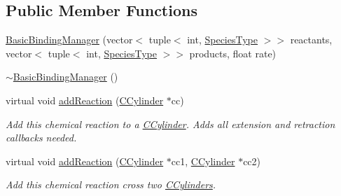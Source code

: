 \subsection*{Public Member Functions}
\begin{DoxyCompactItemize}
\item 
\hyperlink{classBasicBindingManager_ad57b38f098621ae0408069c49c17db52}{Basic\+Binding\+Manager} (vector$<$ tuple$<$ int, \hyperlink{Species_8h_a50651af47c56ea0e27235468d23542cf}{Species\+Type} $>$$>$ reactants, vector$<$ tuple$<$ int, \hyperlink{Species_8h_a50651af47c56ea0e27235468d23542cf}{Species\+Type} $>$$>$ products, float rate)
\item 
\hyperlink{classBasicBindingManager_ab382b0c661238e95df9d64f556ddc6d4}{$\sim$\+Basic\+Binding\+Manager} ()
\item 
virtual void \hyperlink{classBasicBindingManager_a9dbb688abc218187913b23fa3dccd97d}{add\+Reaction} (\hyperlink{classCCylinder}{C\+Cylinder} $\ast$cc)
\begin{DoxyCompactList}\small\item\em Add this chemical reaction to a \hyperlink{classCCylinder}{C\+Cylinder}. Adds all extension and retraction callbacks needed. \end{DoxyCompactList}\item 
virtual void \hyperlink{classBasicBindingManager_aea22a428f792f83f02ba58796ccd882e}{add\+Reaction} (\hyperlink{classCCylinder}{C\+Cylinder} $\ast$cc1, \hyperlink{classCCylinder}{C\+Cylinder} $\ast$cc2)
\begin{DoxyCompactList}\small\item\em Add this chemical reaction cross two \hyperlink{classCCylinder}{C\+Cylinders}. \end{DoxyCompactList}\end{DoxyCompactItemize}
